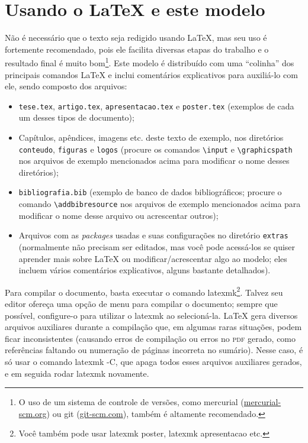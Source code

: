 
\chapter{Usando o \LaTeX{} e este modelo}

Não é necessário que o texto seja redigido usando \LaTeX{}, mas seu
uso é fortemente recomendado, pois ele facilita diversas etapas do
trabalho e o resultado final é muito bom\footnote{O uso de um sistema de
controle de versões, como mercurial (\url{mercurial-scm.org}) ou git
(\url{git-scm.com}), também é altamente recomendado.}. Este modelo é
distribuído com uma ``colinha'' dos principais comandos \LaTeX{} e inclui
comentários explicativos para auxiliá-lo com ele, sendo composto dos
arquivos:

\begin{itemize}
  \item \texttt{tese.tex}, \texttt{artigo.tex}, \texttt{apresentacao.tex}
        e \texttt{poster.tex} (exemplos de cada um desses tipos de documento);
  \item Capítulos, apêndices, imagens etc. deste texto de exemplo, nos
        diretórios \texttt{conteudo}, \texttt{figuras} e \texttt{logos}
        (procure os comandos \texttt{\textbackslash{}input} e
        \texttt{\textbackslash{}graphicspath} nos arquivos de exemplo
        mencionados acima para modificar o nome desses diretórios);
  \item \texttt{bibliografia.bib} (exemplo de banco de dados bibliográficos;
        procure o comando \texttt{\textbackslash{}addbibresource} nos
        arquivos de exemplo mencionados acima para modificar o nome desse
        arquivo ou acrescentar outros);
  \item Arquivos com as \textit{packages} usadas e suas configurações
        no diretório \texttt{extras} (normalmente não precisam ser
        editados, mas você pode acessá-los se quiser aprender mais
        sobre \LaTeX{} ou modificar/acrescentar algo ao modelo; eles
        incluem vários comentários explicativos, alguns bastante
        detalhados).
\end{itemize}

\froufrou

Para compilar o documento, basta executar o comando
\textsf{latexmk}\footnote{Você também pode usar \textsf{latexmk poster},
\textsf{latexmk apresentacao} etc.}. Talvez seu editor ofereça uma opção
de menu para compilar o documento; sempre que possível, configure-o para
utilizar o \textsf{latexmk} ao selecioná-la. \LaTeX{} gera diversos arquivos
auxiliares durante a compilação que, em algumas raras situações, podem ficar
inconsistentes (causando erros de compilação ou erros no \textsc{pdf} gerado,
como referências faltando ou numeração de páginas incorreta no sumário).
Nesse caso, é só usar o comando \textsf{latexmk -C}, que apaga todos esses
arquivos auxiliares gerados, e em seguida rodar \textsf{latexmk} novamente.

